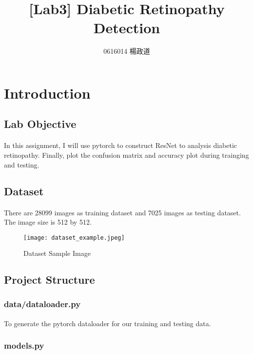 \title{[Lab3] Diabetic Retinopathy Detection}
\author{0616014 楊政道}
\maketitle
\thispagestyle{fancy}
\section{Introduction}
\subsection{Lab Objective}
\paragraph{}
In this assignment, I will use pytorch to construct ResNet to analysis diabetic retinopathy. Finally, plot the confusion matrix and accuracy plot during trainging and testing.
\subsection{Dataset}
\paragraph{}
There are 28099 images as training dataset and 7025 images as testing dataset. The image size is 512 by 512.
\begin{figure}[!ht]
    \begin{center} 
        \texttt{[image: dataset\_example.jpeg]}
        \caption{Dataset Sample Image}
    \end{center} 
\end{figure}
\subsection{Project Structure}
\subsubsection{data/dataloader.py}
\paragraph{}
To generate the pytorch dataloader for our training and testing data.
\subsubsection{models.py}

